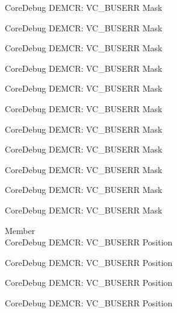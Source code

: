 \begin{DoxyRefList}
\label{deprecated__deprecated000204}%
%
Core\+Debug DEMCR\+: VC\+\_\+\+BUSERR Mask 

\label{deprecated__deprecated000346}%
%
Core\+Debug DEMCR\+: VC\+\_\+\+BUSERR Mask 

\label{deprecated__deprecated000422}%
%
Core\+Debug DEMCR\+: VC\+\_\+\+BUSERR Mask 

\label{deprecated__deprecated000511}%
%
Core\+Debug DEMCR\+: VC\+\_\+\+BUSERR Mask 

\label{deprecated__deprecated000613}%
%
Core\+Debug DEMCR\+: VC\+\_\+\+BUSERR Mask 

\label{deprecated__deprecated000719}%
%
Core\+Debug DEMCR\+: VC\+\_\+\+BUSERR Mask 

\label{deprecated__deprecated000863}%
%
Core\+Debug DEMCR\+: VC\+\_\+\+BUSERR Mask 

\label{deprecated__deprecated001005}%
%
Core\+Debug DEMCR\+: VC\+\_\+\+BUSERR Mask 

\label{deprecated__deprecated001081}%
%
Core\+Debug DEMCR\+: VC\+\_\+\+BUSERR Mask 

\label{deprecated__deprecated001170}%
%
Core\+Debug DEMCR\+: VC\+\_\+\+BUSERR Mask 

\label{deprecated__deprecated001272}%
%
Core\+Debug DEMCR\+: VC\+\_\+\+BUSERR Mask  
\item[Member \doxylink{group___c_m_s_i_s___core_debug_gab8e3d8f0f9590a51bbf10f6da3ad6933}{Core\+Debug\+\_\+\+DEMCR\+\_\+\+VC\+\_\+\+BUSERR\+\_\+\+Pos} ]\hfill \\
\label{deprecated__deprecated000059}%
%
Core\+Debug DEMCR\+: VC\+\_\+\+BUSERR Position 

\label{deprecated__deprecated000203}%
%
Core\+Debug DEMCR\+: VC\+\_\+\+BUSERR Position 

\label{deprecated__deprecated000345}%
%
Core\+Debug DEMCR\+: VC\+\_\+\+BUSERR Position 

\label{deprecated__deprecated000421}%
%
Core\+Debug DEMCR\+: VC\+\_\+\+BUSERR Position 


\end{DoxyRefList}
